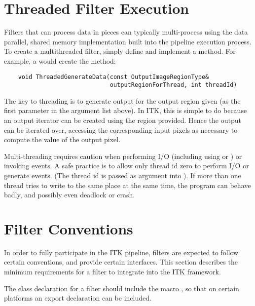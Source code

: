 \section{Threaded Filter Execution}
\label{sec:ThreadedFilterExecution}

Filters that can process data in pieces can typically multi-process
using the data parallel, shared memory implementation built into the
pipeline execution process. To create a multithreaded filter, simply
define and implement a  method. For
example, a  would create the method:

\small
\begin{verbatim}
    void ThreadedGenerateData(const OutputImageRegionType& 
                              outputRegionForThread, int threadId)
\end{verbatim}
\normalsize

The key to threading is to generate output for the output region given (as
the first parameter in the argument list above). In ITK, this is simple to do
because an output iterator can be created using the region provided. Hence
the output can be iterated over, accessing the corresponding input pixels as
necessary to compute the value of the output pixel.

Multi-threading requires caution when performing I/O (including using
 or ) or invoking events. A safe practice is to allow 
only thread id zero to perform I/O or generate events. (The thread id is
passed as argument into ).  If more than one
thread tries to write to the same place at the same time, the program can
behave badly, and possibly even deadlock or crash.


\section{Filter Conventions}
\label{sec:FilterConventions}

In order to fully participate in the ITK pipeline, filters are expected to
follow certain conventions, and provide certain interfaces.  This section
describes the minimum requirements for a filter to integrate into the ITK
framework.

The class declaration for a filter should include the macro
, so that on certain platforms an export declaration can be
included. 

